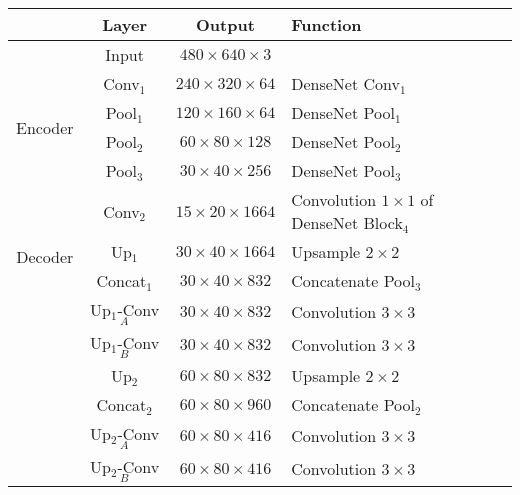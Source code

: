 \documentclass[10pt,twocolumn,letterpaper]{article}
\begin{document}
\begin{table}[h]
  \footnotesize
  \centering
  \begin{tabular}{c|c|c|p{2.25cm}}
                             & Layer           & Output                      & Function                                      \\
    \hline
                             & Input           & $480 \times 640 \times 3$   &                                               \\
    \hline
    \multirow{4}{*}{Encoder}
                             & Conv$_1$        & $240 \times 320 \times 64$  & DenseNet Conv$_1$                             \\
                             & Pool$_1$        & $120 \times 160 \times 64$  & DenseNet Pool$_1$                             \\
                             & Pool$_2$        & $60 \times 80 \times 128$   & DenseNet Pool$_2$                             \\
                             & Pool$_3$        & $30 \times 40 \times 256$   & DenseNet Pool$_3$                             \\
    \hline
    \multirow{4}{*}{Decoder} & Conv$_2$        & $15 \times 20 \times 1664$  & Convolution $1\times 1$ of DenseNet Block$_4$ \\
                             & Up$_1$          & $30 \times 40 \times 1664$  & Upsample $2\times 2$                          \\
                             & Concat$_1$      & $30 \times 40 \times 832$   & Concatenate Pool$_3$                          \\
                             & Up$_1$-Conv$_A$ & $30 \times 40 \times 832$   & Convolution $3\times 3$                       \\
                             & Up$_1$-Conv$_B$ & $30 \times 40 \times 832$   & Convolution $3\times 3$                       \\
                             & Up$_2$          & $60 \times 80 \times 832$   & Upsample $2\times 2$                          \\
                             & Concat$_2$      & $60 \times 80 \times 960$   & Concatenate Pool$_2$                          \\
                             & Up$_2$-Conv$_A$ & $60 \times 80 \times 416$   & Convolution $3\times 3$                       \\
                             & Up$_2$-Conv$_B$ & $60 \times 80 \times 416$   & Convolution $3\times 3$                       \\

\end{tabular}
\end{table}
\end{document}

